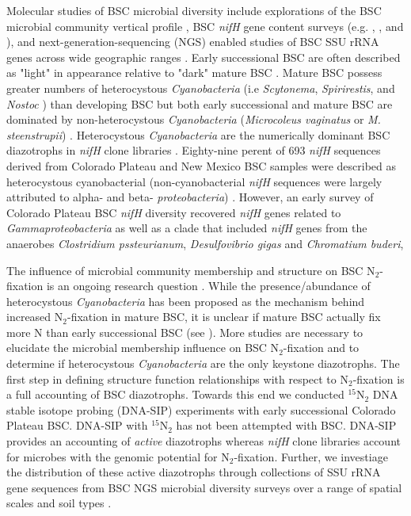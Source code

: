 Molecular studies of BSC microbial diversity include explorations of the BSC
microbial community vertical profile \citep{Garcia_Pichel_2003}, BSC
\textit{nifH} gene content surveys (e.g. \citet{14766579}, \citet{Yeager_2012},
\citet{Yeager} and \citet{Steppe_1996}), and next-generation-sequencing (NGS)
enabled studies of BSC SSU rRNA genes across wide geographic ranges
\citep{Garcia_Pichel_2013, Steven_2013}. Early successional  BSC are often
described as "light" in appearance relative to "dark" mature BSC
\citep{Belnap_2002, 14766579}. Mature BSC possess greater numbers of
heterocystous \textit{Cyanobacteria} (i.e \textit{Scytonema},
\textit{Spirirestis}, and \textit{Nostoc} \citep{Yeager, Yeager_2012}) than
developing BSC but both early successional and mature BSC are dominated by
non-heterocystous \textit{Cyanobacteria} (\textit{Microcoleus vaginatus} or
\textit{M. steenstrupii}) \citep{14766579, Garcia_Pichel_2013}.  Heterocystous
\textit{Cyanobacteria} are the numerically dominant BSC diazotrophs in
\textit{nifH} clone libraries \citep{Yeager, 14766579, Yeager_2012}.
Eighty-nine perent of 693 \textit{nifH} sequences derived from Colorado Plateau and
New Mexico BSC samples were described as heterocystous cyanobacterial
(non-cyanobacterial \textit{nifH} sequences were largely attributed to alpha-
and beta- \textit{proteobacteria}) \citep{Yeager}. However, an early survey of
Colorado Plateau BSC \textit{nifH} diversity recovered \textit{nifH} genes
related to \textit{Gammaproteobacteria} as well as a clade that included
\textit{nifH} genes from the anaerobes \textit{Clostridium pssteurianum},
\textit{Desulfovibrio gigas} and \textit{Chromatium buderi},

The influence of microbial community membership and structure on BSC
N$_{2}$-fixation is an ongoing research question \citep{Belnap28062013}. While
the presence/abundance of heterocystous \textit{Cyanobacteria} has been
proposed as the mechanism behind increased N$_{2}$-fixation in mature BSC, it
is unclear if mature BSC actually fix more N than early successional BSC (see
\citet{15643930}). More studies are necessary to elucidate the microbial
membership influence on BSC N$_{2}$-fixation and to determine if heterocystous
\textit{Cyanobacteria} are the only keystone diazotrophs. The first step in
defining structure function relationships with respect to N$_{2}$-fixation is a
full accounting of BSC diazotrophs. Towards this end we conducted
$^{15}$N$_{2}$ DNA stable isotope probing (DNA-SIP) experiments with early
successional Colorado Plateau BSC.  DNA-SIP with $^{15}$N$_{2}$ has not been
attempted with BSC. DNA-SIP provides an accounting of \textit{active}
diazotrophs whereas \textit{nifH} clone libraries account for microbes with the
genomic potential for N$_{2}$-fixation.  Further, we investiage the
distribution of these active diazotrophs through collections of SSU rRNA
gene sequences from BSC NGS microbial diversity surveys over a range of spatial
scales and soil types \citep{Garcia_Pichel_2013, Steven_2013}. 
